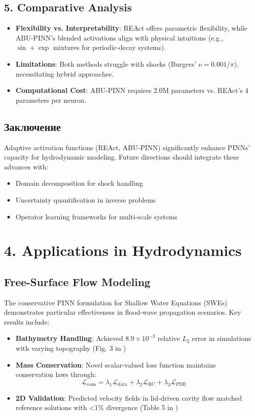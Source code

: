 \subsection*{5. Comparative Analysis}
\begin{itemize}
    \item \textbf{Flexibility vs. Interpretability}: REAct offers parametric flexibility, while ABU-PINN's blended activations align with physical intuitions (e.g., $\sin+\exp$ mixtures for periodic-decay systems).
    \item \textbf{Limitations}: Both methods struggle with shocks (Burgers' $\nu=0.001/\pi$), necessitating hybrid approaches.
    \item \textbf{Computational Cost}: ABU-PINN requires 2.0M parameters vs. REAct's 4 parameters per neuron.
\end{itemize}

\subsection{Заключение}
Adaptive activation functions (REAct, ABU-PINN) significantly enhance PINNs' capacity for hydrodynamic modeling. Future directions should integrate these advances with:
\begin{itemize}
    \item Domain decomposition for shock handling
    \item Uncertainty quantification in inverse problems
    \item Operator learning frameworks for multi-scale systems
\end{itemize}

\section*{4. Applications in Hydrodynamics}
\subsection*{Free-Surface Flow Modeling}
The conservative PINN formulation for Shallow Water Equations (SWEs) \cite{free_surface} demonstrates particular effectiveness in flood-wave propagation scenarios. Key results include:
\begin{itemize}
    \item \textbf{Bathymetry Handling}: Achieved $8.9 \times 10^{-3}$ relative $L_2$ error in simulations with varying topography (Fig. 3 in \cite{free_surface})
    \item \textbf{Mass Conservation}: Novel scalar-valued loss function maintains conservation laws through:
    \[
    \mathcal{L}_{\text{cons}} = \lambda_1\mathcal{L}_{\text{data}} + \lambda_2\mathcal{L}_{\text{BC}} + \lambda_3\mathcal{L}_{\text{PDE}}
    \]
    \item \textbf{2D Validation}: Predicted velocity fields in lid-driven cavity flow matched reference solutions with <1\% divergence (Table 5 in \cite{abu_pinn})
\end{itemize}

